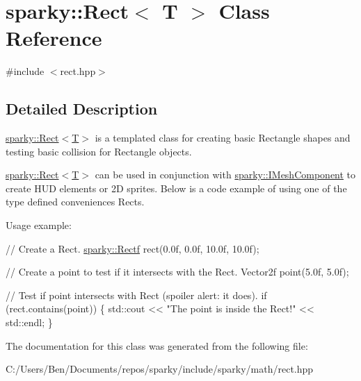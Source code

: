 \hypertarget{classsparky_1_1_rect_3_01_t_01_4}{}\section{sparky\+:\+:Rect$<$ T $>$ Class Reference}
\label{classsparky_1_1_rect_3_01_t_01_4}


{\ttfamily \#include $<$rect.\+hpp$>$}



\subsection{Detailed Description}
\hyperlink{classsparky_1_1_rect_3_01_t_01_4}{sparky\+::\+Rect$<$\+T$>$} is a templated class for creating basic Rectangle shapes and testing basic collision for Rectangle objects.

\hyperlink{classsparky_1_1_rect_3_01_t_01_4}{sparky\+::\+Rect$<$\+T$>$} can be used in conjunction with \hyperlink{classsparky_1_1_i_mesh_component}{sparky\+::\+I\+Mesh\+Component} to create H\+UD elements or 2D sprites. Below is a code example of using one of the type defined conveniences Rects.

Usage example\+: 
\begin{DoxyCode}
\textcolor{comment}{// Create a Rect.}
\hyperlink{classsparky_1_1_rect}{sparky::Rectf} rect(0.0f, 0.0f, 10.0f, 10.0f);

\textcolor{comment}{// Create a point to test if it intersects with the Rect.}
Vector2f point(5.0f, 5.0f);

\textcolor{comment}{// Test if point intersects with Rect (spoiler alert: it does).}
\textcolor{keywordflow}{if} (rect.contains(point))
\{
    std::cout << \textcolor{stringliteral}{"The point is inside the Rect!"} << std::endl;
\}
\end{DoxyCode}
 

The documentation for this class was generated from the following file\+:\begin{DoxyCompactItemize}
\item 
C\+:/\+Users/\+Ben/\+Documents/repos/sparky/include/sparky/math/rect.\+hpp\end{DoxyCompactItemize}
